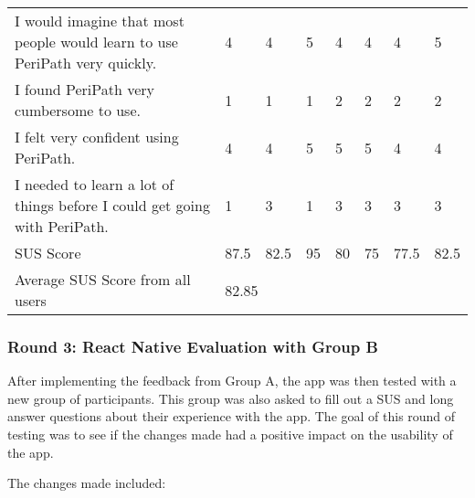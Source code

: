 \begin{table}[]
{\begin{tabular}{llllllll}
    I would imagine that most people would learn to use PeriPath very quickly.              & 4      & 4      & 5      & 4      & 4      & 4      & 5      \\
    I found PeriPath very cumbersome to use.                                                & 1      & 1      & 1      & 2      & 2      & 2      & 2      \\
    I felt very confident using PeriPath.                                                   & 4      & 4      & 5      & 5      & 5      & 4      & 4      \\
    I needed to learn a lot of things before I could get going with PeriPath.               & 1      & 3      & 1      & 3      & 3      & 3      & 3      \\ \hline
    SUS Score                                                                               & 87.5   & 82.5   & 95     & 80     & 75     & 77.5   & 82.5   \\
    Average SUS Score from all users                                                        & \multicolumn{7}{l}{82.85}                                    \\ \hline
    \end{tabular}
    }
    \end{table}

\subsubsection{Round 3: React Native Evaluation with Group B}
After implementing the feedback from Group A, the app was then tested with a new group of participants. This group was also asked to fill out a SUS and long answer questions about their experience with the app. The goal of this round of testing was to see if the changes made had a positive impact on the usability of the app.

The changes made included: 

